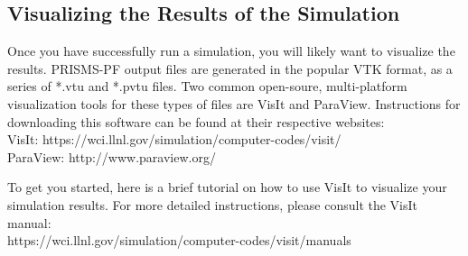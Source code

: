 \documentclass[10pt]{article} %
\begin{document}
\subsection{Visualizing the Results of the Simulation}
Once you have successfully run a simulation, you will likely want to visualize the results.  PRISMS-PF output files are generated in the popular VTK format, as a series of *.vtu and *.pvtu files. Two common open-soure, multi-platform visualization tools for these types of files are VisIt and ParaView. Instructions for downloading this software can be found at their respective websites:
\\VisIt: https://wci.llnl.gov/simulation/computer-codes/visit/
\\ParaView: http://www.paraview.org/

To get you started, here is a brief tutorial on how to use VisIt to visualize your simulation results. For more detailed instructions, please consult the VisIt manual:
\\ https://wci.llnl.gov/simulation/computer-codes/visit/manuals
\end{document}
